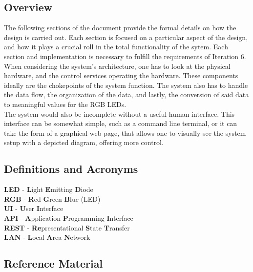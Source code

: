 \documentclass[onecolumn, draftclsnofoot,10pt, compsoc]{IEEEtran}
\begin{document}
		\subsection{Overview}
		The following sections of the document provide the formal details on how the design is carried out. Each section is focused on a particular aspect of the
		design, and how it plays a crucial roll in the total functionality of the sytem. Each section and implementation is necessary to fulfill the requirements of
		Iteration 6.\\

		\noindent When considering the system's architecture, one has to look at the physical hardware, and the control services operating the hardware. These components
		ideally are the chokepoints of the system function. The system also has to handle the data flow, the organization of the data, and lastly, the
		conversion of said data to meaningful values for the RGB LEDs.\\

		\noindent The system would also be incomplete without a useful human interface. This interface can be somewhat simple, such as a command line terminal, or it can
		take the form of a graphical web page, that allows one to visually see the system setup with a depicted diagram, offering more control.


		\subsection{Definitions and Acronyms}
		\textbf{LED} - \textbf{L}ight \textbf{E}mitting \textbf{D}iode
		\\\textbf{RGB} - \textbf{R}ed \textbf{G}reen \textbf{B}lue (LED)
		\\\textbf{UI} - \textbf{U}ser \textbf{I}nterface
		\\\textbf{API} - \textbf{A}pplication \textbf{P}rogramming \textbf{I}nterface
		\\\textbf{REST} - \textbf{Re}presentational \textbf{S}tate \textbf{T}ransfer
		\\\textbf{LAN} - \textbf{L}ocal \textbf{A}rea \textbf{N}etwork


		\subsection{Reference Material}
			\begingroup
				\renewcommand{\addcontentsline}[3]{}%
				\renewcommand{\section}[2]{}%
				
				
			\endgroup
\end{document}
